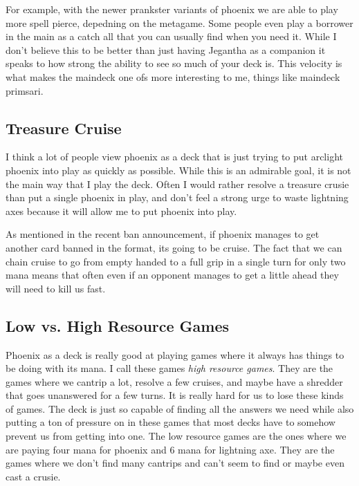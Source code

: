 \documentclass[12pt]{article}
\begin{document}
For example, with the newer prankster variants of phoenix we are able to play more spell pierce, depedning on the metagame. Some people even play a borrower in the main as a catch all that you can usually find when you need it. While I don't believe this to be better than just having Jegantha as a companion it speaks to how strong the ability to see so much of your deck is. This velocity is what makes the maindeck one ofs more interesting to me, things like maindeck primsari.

\subsection{Treasure Cruise}
I think a lot of people view phoenix as a deck that is just trying to put arclight phoenix into play as quickly as possible. While this is an admirable goal, it is not the main way that I play the deck. Often I would rather resolve a treasure crusie than put a single phoenix in play, and don't feel a strong urge to waste lightning axes because it will allow me to put phoenix into play.

As mentioned in the recent ban announcement, if phoenix manages to get another card banned in the format, its going to be cruise. The fact that we can chain cruise to go from empty handed to a full grip in a single turn for only two mana means that often even if an opponent manages to get a little ahead they will need to kill us fast.

\subsection{Low vs. High Resource Games}
Phoenix as a deck is really good at playing games where it always has things to be doing with its mana. I call these games \emph{high resource games}. They are the games where we cantrip a lot, resolve a few cruises, and maybe have a shredder that goes unanswered for a few turns. It is really hard for us to lose these kinds of games. The deck is just so capable of finding all the answers we need while also putting a ton of pressure on in these games that most decks have to somehow prevent us from getting into one. The low resource games are the ones where we are paying four mana for phoenix and 6 mana for lightning axe. They are the games where we don't find many cantrips and can't seem to find or maybe even cast a crusie.
\end{document}
